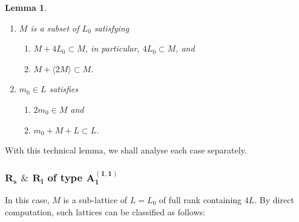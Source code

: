 \documentclass[11pt]{amsart}
\newtheorem{lemma}[thm]{Lemma}%
\begin{document}
\begin{lemma}\label{lemma_rank-1}
\begin{enumerate}
\item $M$ is a subset of $L_0$ satisfying
\begin{enumerate}
\item[(i)] $M+4L_0 \subset M$, in particular, $4L_0 \subset M$, and 
\item[(ii)] $M+\langle 2M \rangle \subset M$.
\end{enumerate}
\item $m_0 \in L$ satisfies
\begin{enumerate}
\item[(i)] $2m_0 \in M$ and
\item[(ii)] $m_0+M+L \subset L$. 
\end{enumerate}
\end{enumerate}
\end{lemma}

With this technical lemma, we shall analyse each case separately. 
\subsubsection{$\mathbf{R_s}$ $\&$ $\mathbf{R_l}$ of type $\mathbf{A_1^{(1,1)}}$}
In this case, $M$ is a sub-lattice of $L=L_0$ of full rank containing $4L$. 
By direct computation, such lattices can be classified as follows:
\end{document}
